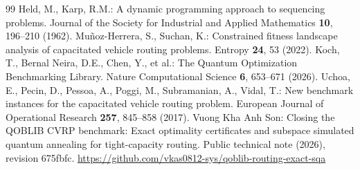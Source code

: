 \documentclass[runningheads]{llncs}
\begin{document}
\begin{thebibliography}{99}
 Held, M., Karp, R.M.: A dynamic programming approach to sequencing problems. Journal of the Society for Industrial and Applied Mathematics \textbf{10}, 196--210 (1962). 
 Muñoz-Herrera, S., Suchan, K.: Constrained fitness landscape analysis of capacitated vehicle routing problems. Entropy \textbf{24}, 53 (2022). 
 Koch, T., Bernal Neira, D.E., Chen, Y., et al.: The Quantum Optimization Benchmarking Library. Nature Computational Science \textbf{6}, 653--671 (2026). 
 Uchoa, E., Pecin, D., Pessoa, A., Poggi, M., Subramanian, A., Vidal, T.: New benchmark instances for the capacitated vehicle routing problem. European Journal of Operational Research \textbf{257}, 845--858 (2017). 
 Vuong Kha Anh Son: Closing the QOBLIB CVRP benchmark: Exact optimality certificates and subspace simulated quantum annealing for tight-capacity routing. Public technical note (2026), revision 675fbfc. \url{https://github.com/vkas0812-sys/qoblib-routing-exact-sqa}
\end{thebibliography}
\end{document}
